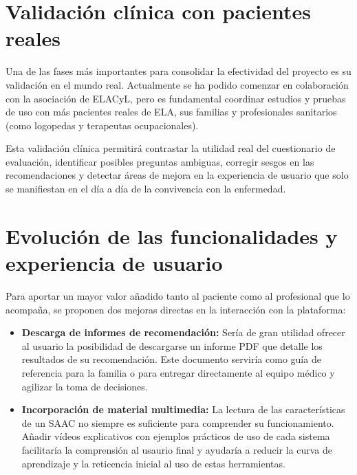 \section{Validación clínica con pacientes reales}
Una de las fases más importantes para consolidar la efectividad del proyecto es su validación en el mundo real. Actualmente se ha podido comenzar en colaboración con la asociación de ELACyL, pero es fundamental coordinar estudios y pruebas de uso con más pacientes reales de ELA, sus familias y profesionales sanitarios (como logopedas y terapeutas ocupacionales). 

Esta validación clínica permitirá contrastar la utilidad real del cuestionario de evaluación, identificar posibles preguntas ambiguas, corregir sesgos en las recomendaciones y detectar áreas de mejora en la experiencia de usuario que solo se manifiestan en el día a día de la convivencia con la enfermedad.

\section{Evolución de las funcionalidades y experiencia de usuario}
Para aportar un mayor valor añadido tanto al paciente como al profesional que lo acompaña, se proponen dos mejoras directas en la interacción con la plataforma:
\begin{itemize}
    	\item \textbf{Descarga de informes de recomendación:} Sería de gran utilidad ofrecer al usuario la posibilidad de descargarse un informe PDF que detalle los resultados de su recomendación. Este documento serviría como guía de referencia para la familia o para entregar 				directamente al equipo médico y agilizar la toma de decisiones.
    	\item \textbf{Incorporación de material multimedia:} La lectura de las características de un SAAC no siempre es suficiente para comprender su funcionamiento. Añadir vídeos explicativos con ejemplos prácticos de uso de cada sistema facilitaría la comprensión al usaurio final y 			ayudaría a reducir la curva de aprendizaje y la reticencia inicial al uso de estas herramientas.
\end{itemize}

